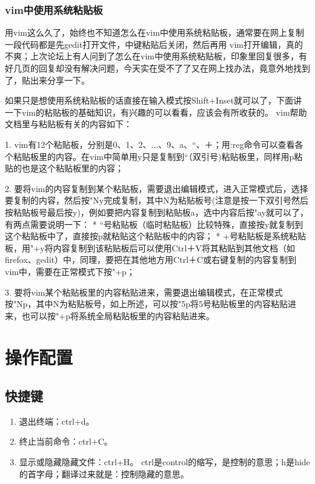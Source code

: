 {\subsection{vim中使用系统粘贴板}
用vim这么久了，始终也不知道怎么在vim中使用系统粘贴板，通常要在网上复制一段代码都是先gedit打开文件，中键粘贴后关闭，然后再用 vim打开编辑，真的不爽；上次论坛上有人问到了怎么在vim中使用系统粘贴板，印象里回复很多，有好几页的回复却没有解决问题，今天实在受不了了又在网上找办法，竟意外地找到了，贴出来分享一下。 

如果只是想使用系统粘贴板的话直接在输入模式按Shift+Inset就可以了，下面讲一下vim的粘贴板的基础知识，有兴趣的可以看看，应该会有所收获的。 
vim帮助文档里与粘贴板有关的内容如下： 

1. vim有12个粘贴板，分别是0、1、2、...、9、a、“、＋；用:reg命令可以查看各个粘贴板里的内容。在vim中简单用y只是复制到“（双引号)粘贴板里，同样用p粘贴的也是这个粘贴板里的内容； 

2. 要将vim的内容复制到某个粘贴板，需要退出编辑模式，进入正常模式后，选择要复制的内容，然后按"Ny完成复制，其中N为粘贴板号(注意是按一下双引号然后按粘贴板号最后按y)，例如要把内容复制到粘贴板a，选中内容后按"ay就可以了，有两点需要说明一下： 
* “号粘贴板（临时粘贴板）比较特殊，直接按y就复制到这个粘贴板中了，直接按p就粘贴这个粘贴板中的内容； 
* +号粘贴板是系统粘贴板，用"+y将内容复制到该粘贴板后可以使用Ctrl＋V将其粘贴到其他文档（如firefox、gedit）中，同理，要把在其他地方用Ctrl＋C或右键复制的内容复制到vim中，需要在正常模式下按"+p； 

3. 要将vim某个粘贴板里的内容粘贴进来，需要退出编辑模式，在正常模式按"Np，其中N为粘贴板号，如上所述，可以按"5p将5号粘贴板里的内容粘贴进来，也可以按"+p将系统全局粘贴板里的内容粘贴进来。 




\chapter{操作配置}
\section{快捷键}
\begin{enumerate}
\item 退出终端：ctrl+d。

\item 终止当前命令：ctrl+C。

\item 显示或隐藏隐藏文件：ctrl+H。 ctrl是control的缩写，是控制的意思；h是hide的首字母；翻译过来就是：控制隐藏的意思。


\end{enumerate}}

